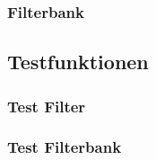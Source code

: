 \subsubsection{Filterbank}\label{sec:impl_bank}

\subsection{Testfunktionen}\label{sec:impl_test}

\subsubsection{Test Filter}\label{sec:impl_testFilter}

\subsubsection{Test Filterbank}\label{sec:impl_testBank}
